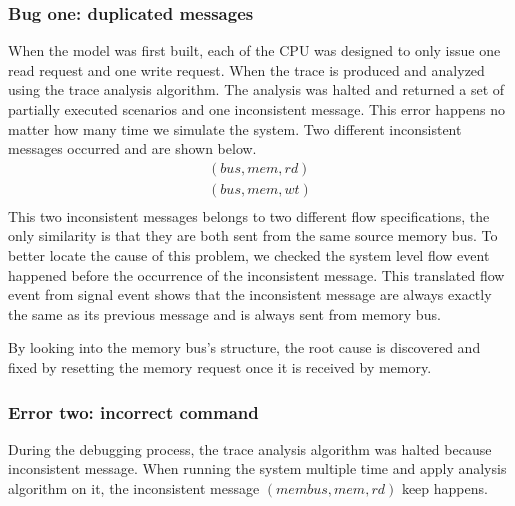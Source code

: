 \documentclass[12pt,frontmatter,copyright,thesis]{usfmanus}
\begin{document}
\subsubsection{Bug one: duplicated messages}
When the model was first built, each of the CPU was designed to only issue one
read request and one write request. When the trace is produced and analyzed using
the trace analysis algorithm. The analysis was halted and returned a set of partially
executed scenarios and one inconsistent message. This error happens no matter
how many time we simulate the system.
Two different inconsistent messages occurred and are shown below.
\[
 \begin{array}{l}
(bus, mem, rd)\\
(bus, mem, wt)\\
\end{array}
\] 
This two inconsistent messages belongs to two different flow specifications,
the only similarity is that they are both sent from the same source memory bus.
To better locate the cause of this problem, we checked the system level flow event
happened before the occurrence of the inconsistent message. 
This translated flow event from signal event shows that the inconsistent
message are always exactly the same as its previous message
and is always sent from memory bus.

By looking into the memory bus's structure, the root cause is discovered and 
fixed by resetting the memory request once it is received by memory.

\subsubsection{Error two: incorrect command}
During the debugging process, the trace analysis algorithm was halted because
inconsistent message.
When running the system multiple time and apply analysis algorithm on it,
the inconsistent message $(membus, mem, rd)$ keep happens.
\end{document}
